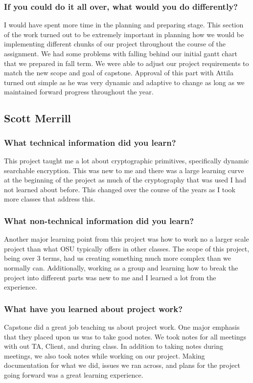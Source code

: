 \subsubsection{If you could do it all over, what would you do differently?}
I would have spent more time in the planning and preparing stage. This section of the work turned out to be extremely important in planning how we would be implementing different chunks of our project throughout the course of the assignment. We had some problems with falling behind our initial gantt chart that we prepared in fall term. We were able to adjust our project requirements to match the new scope and goal of capstone. Approval of this part with Attila turned out simple as he was very dynamic and adaptive to change as long as we maintained forward progress throughout the year.

\subsection{Scott Merrill}

\subsubsection{What technical information did you learn?}
This project taught me a lot about cryptographic primitives, specifically dynamic searchable encryption. This was new to me and there was a large learning curve at the beginning of the project as much of the cryptography that was used I had not learned about before. This changed over the course of the years as I took more classes that address this.

\subsubsection{What non-technical information did you learn?}
Another major learning point from this project was how to work no a larger scale project than what OSU typically offers in other classes. The scope of this project, being over 3 terms, had us creating something much more complex than we normally can. Additionally, working as a group and learning how to break the project into different parts was new to me and I learned a lot from the experience.

\subsubsection{What have you learned about project work?}
Capstone did a great job teaching us about project work. One major emphasis that they placed upon us was to take good notes. We took notes for all meetings with out TA, Client, and during class. In addition to taking notes during meetings, we also took notes while working on our project. Making documentation for what we did, issues we ran across, and plans for the project going forward was a great learning experience.

